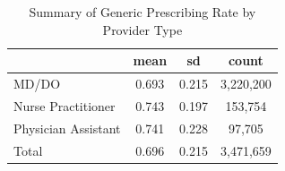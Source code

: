 \begin{table}[htbp]\centering
\def\sym#1{\ifmmode^{#1}\else\(^{#1}\)\fi}
\caption{Summary of Generic Prescribing Rate by Provider Type}
\begin{tabular}{l*{1}{ccc}}
\toprule
                    &        mean&          sd&       count\\
\midrule
MD/DO               &       0.693&       0.215&   3,220,200\\
Nurse Practitioner  &       0.743&       0.197&     153,754\\
Physician Assistant &       0.741&       0.228&      97,705\\
Total               &       0.696&       0.215&   3,471,659\\
\bottomrule
\end{tabular}
\end{table}
